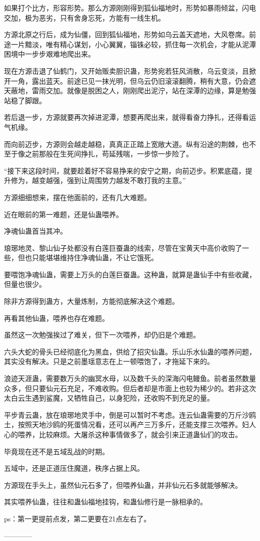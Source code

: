 \begin{this_body}
如果打个比方，形容形势。那么方源刚刚得到狐仙福地时，形势如暴雨倾盆，闪电交加，极为恶劣，只有舍身忘死，方能有一线生机。

方源北原之行后，成为仙僵，回到狐仙福地，形势如乌云盖天遮地，大风卷席。前途一片黯淡，唯有精心谋划，小心翼翼，锱铢必较，抓住每一次机会，才能从泥潭困境中一步步艰难地爬出来。

现在方源击退了仙鹤门，又开始贩卖胆识蛊，形势宛若狂风消散，乌云变淡，且掀开一角，露出蓝天。前途已见一抹光明，但乌云仍旧滚滚翻腾，稍有大意，仍会遮天蔽地，雷雨交加。就像是脱困之人，刚刚爬出泥泞，站在深潭的边缘，算是勉强站稳了脚跟。

若后退一步，方源就要再次掉进泥潭，想要再爬出来，就得看奋力挣扎，还得看运气机缘。

而向前迈步，方源则会越走越稳，真真正正踏上宽敞大道。纵有沿途的荆棘，也不至于像之前那般在生死间挣扎，苟延残喘，一步惊一步险了。

“接下来这段时间，就要趁着好不容易挣来的安宁之期，向前迈步。积累底蕴，提升修为，越变越强，强到让周围势力越发不敢打我的主意。”

方源细细想来，摆在他面前的，还有几大难题。

近在眼前的第一难题，还是仙蛊喂养。

净魂仙蛊首当其冲。

琅琊地灵、黎山仙子处都没有白莲巨蚕蛊的线索，尽管在宝黄天中高价收购了一些，但也只能堪堪维持住净魂仙蛊，不让它饿死。

要喂饱净魂仙蛊，需要上万头的白莲巨蚕蛊。这种蛊，就算是蛊仙手中有些收藏，但量也很少。

除非方源得到蛊方，大量炼制，方能彻底解决这个难题。

再看其他仙蛊，喂养也存在难题。

虽然这一次勉强挨过了难关，但下一次喂养，却仍旧是个难题。

六头大蛇的骨头已经彻底化为黑血，供给了招灾仙蛊。乐山乐水仙蛊的喂养问题，其实没有解决。只是之前墨瑶意志在上一顿喂饱了，才拖延下来的。

浪迹天涯蛊，需要数万头的幽冥水母，以及数千头的深海闪电鳗鱼。前者虽然数量众多，但只要仙元石充足，不难收购。但后者却是市面上也较为稀少的。若非这次太白云生遇到鲨魔，又牺牲自己，以身犯险，还收购不到充足的量。

平步青云蛊，放在琅琊地灵手中，倒是可以暂时不考虑。连云仙蛊需要的万斤沙鸥土，按照天地沙鸥的死蛋情况看，还可以再产三万多斤，还能支撑三次喂养。妇人心的喂养，比较麻烦。大屠杀这种事情做多了，就会引来正道蛊仙们的攻击。

毕竟现在还不是五域乱战的时期。

五域中，还是正道压住魔道，秩序占据上风。

方源现在手头上，虽然仙元石多了，但喂养仙蛊，并非仙元石多就能够解决。

其实喂养仙蛊，往往和蛊仙福地挂钩，和蛊仙修行是一脉相承的。

ps：第一更提前点发，第二更要在21点左右了。

------------

\end{this_body}

